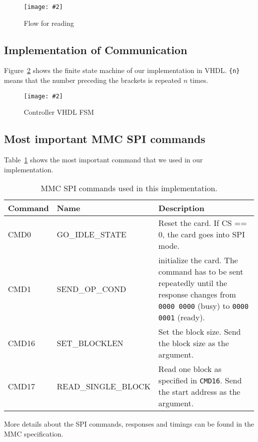 \documentclass[12pt, a4paper]{article}
\newcommand{\image}[5]{
	\begin{figure}[#4]               %
		\centering                     %
		\texttt{[image: \#2]} %
		\caption{#3}                   %
		\label{fig:#5}                 %
	\end{figure}                     %
}
\begin{document}
\image{0.5\textwidth}{../flow_read_mmc.pdf}{Flow for reading}{h}{read}

\subsection{Implementation of Communication}

Figure~\ref{fig:implementation} shows the finite state machine of our implementation in VHDL. \texttt{\{n\}} means that the number preceding the brackets is repeated $n$ times.

\image{1.0\textwidth}{../mmc_controller.pdf}{Controller VHDL FSM}{h}{implementation}

\subsection{Most important MMC SPI commands}

Table~\ref{tab:commands} shows the most important command that we used in our implementation.

\begin{table}[hH]
    \begin{tabular}{|l|l|p{8cm}|}
    \hline
Command    & Name                & Description            \\ \hline
CMD0       & GO\_IDLE\_STATE     & Reset the card. If CS == 0, the card goes into SPI mode. \\
CMD1       & SEND\_OP\_COND      & initialize the card. The command has to be sent repeatedly until the response changes from \texttt{0000 0000} (busy) to \texttt{0000 0001} (ready). \\
CMD16      & SET\_BLOCKLEN       & Set the block size. Send the block size as the argument. \\
CMD17      & READ\_SINGLE\_BLOCK & Read one block as specified in \texttt{CMD16}. Send the start address as the argument. \\
    \hline
    \end{tabular}
    \caption{MMC SPI commands used in this implementation.}
    \label{tab:commands}
\end{table}

More details about the SPI commands, responses and timings can be found in the MMC specification.

\listoffigures
\end{document}
